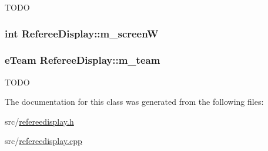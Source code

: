 \label{classRefereeDisplay_a136af0a18d0eadffbcaa755fdf76e328}
TODO \hypertarget{classRefereeDisplay_aed7aa88d65bc9b4f79fe8dd2598a92e5}{
\subsubsection[{m\_\-screenW}]{\setlength{\rightskip}{0pt plus 5cm}int {\bf RefereeDisplay::m\_\-screenW}}}
\label{classRefereeDisplay_aed7aa88d65bc9b4f79fe8dd2598a92e5}
\hypertarget{classRefereeDisplay_a02ec6cdc79904b4727553f6802c36d9e}{
\subsubsection[{m\_\-team}]{\setlength{\rightskip}{0pt plus 5cm}eTeam {\bf RefereeDisplay::m\_\-team}}}
\label{classRefereeDisplay_a02ec6cdc79904b4727553f6802c36d9e}
TODO 

The documentation for this class was generated from the following files:\begin{DoxyCompactItemize}
\item 
src/\hyperlink{refereedisplay_8h}{refereedisplay.h}\item 
src/\hyperlink{refereedisplay_8cpp}{refereedisplay.cpp}\end{DoxyCompactItemize}
